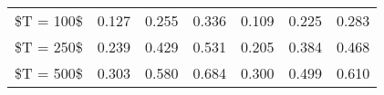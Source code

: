 % 
\begin{tabular}{ccccccc}
  \hline
  \hline
\$T = 100\$ & 0.127 & 0.255 & 0.336 & 0.109 & 0.225 & 0.283 \\ 
  \$T = 250\$ & 0.239 & 0.429 & 0.531 & 0.205 & 0.384 & 0.468 \\ 
  \$T = 500\$ & 0.303 & 0.580 & 0.684 & 0.300 & 0.499 & 0.610 \\ 
   \hline
\end{tabular}
